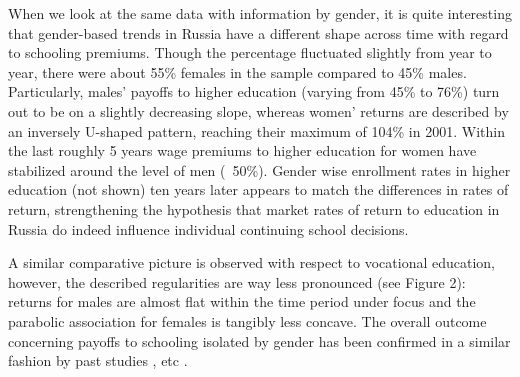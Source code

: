 \documentclass[12pt,a4paper]{article}
\begin{document}
When we look at the same data with information by gender, it is quite interesting that gender-based trends in Russia have a different shape across time with regard to schooling premiums. Though the percentage fluctuated slightly from year to year, there were about 55\% females in the sample compared to 45\% males. Particularly, males' payoffs to higher education (varying from 45\% to 76\%) turn out to be on a slightly decreasing slope, whereas women' returns are described by an inversely U-shaped pattern, reaching their maximum of 104\% in 2001. Within the last roughly 5 years wage premiums to higher education for women have stabilized around the level of men (~50\%).  Gender wise enrollment rates in higher education (not shown) ten years later appears to match the differences in rates of return, strengthening the hypothesis that market rates of return to education in Russia do indeed influence individual continuing school decisions. 

A similar comparative picture is observed with respect to vocational education, however, the described regularities are way less pronounced (see Figure 2): returns for males are almost flat within the time period under focus and the parabolic association for females is tangibly less concave. The overall outcome concerning payoffs to schooling isolated by gender has been confirmed in a similar fashion by past studies \parencite{cheidvasser_006._2007}, etc .
\end{document}
